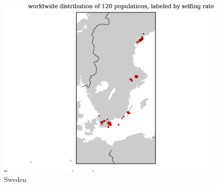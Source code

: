 \documentclass[a4paper,10pt]{article}
\begin{document}
\begin{figure}
\includegraphics[width=1\textwidth]{figures/s0829popid2ecotypeid_5_Swe_10_52_20_65_l3y1_pop_map.eps}
\caption{Sweden}\label{f19}
\end{figure}




\end{document}
